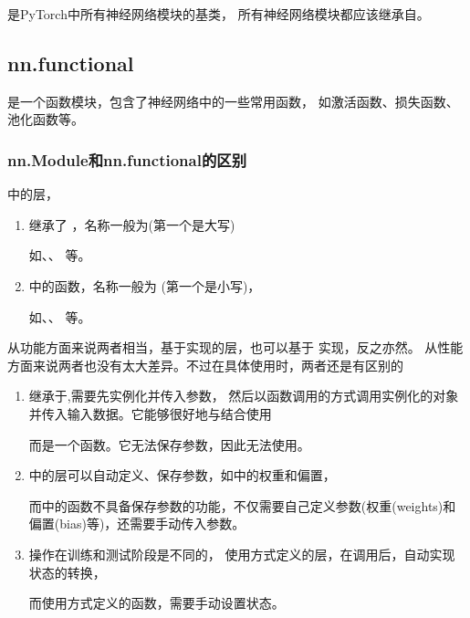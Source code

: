 是PyTorch中所有神经网络模块的基类，
所有神经网络模块都应该继承自。

\subsection{nn.functional}
\label{subsubsec:Pytorch_nn_functional}
是一个函数模块，包含了神经网络中的一些常用函数，
如激活函数、损失函数、池化函数等。


\subsubsection{nn.Module和nn.functional的区别}
\label{subsubsec:Pytorch_nn_Module_and_nn_functional_difference}
中的层，
\begin{enumerate}[label=\arabic*)]
    \item 继承了 ，名称一般为(第一个是大写)

    如、、 等。

    \item  {} 中的函数，名称一般为 (第一个是小写)，

    如、、
  等。
\end{enumerate}
 
  
从功能方面来说两者相当，基于实现的层，也可以基于 实现，反之亦然。
从性能方面来说两者也没有太大差异。不过在具体使用时，两者还是有区别的

\begin{enumerate}[label=\arabic*)]
    \item {}继承于,需要先实例化并传入参数，
    然后以函数调用的方式调用实例化的对象并传入输入数据。它能够很好地与结合使用

    而是一个函数。它无法保存参数，因此无法使用。
    \item {}中的层可以\textcolor{YBXPurple}{自动}定义、保存参数，如中的权重和偏置，

    而中的函数不具备保存参数的功能，不仅需要自己定义参数(权重(weights)和偏置(bias)等)，还需要手动传入参数。

    \item {}操作在训练和测试阶段是不同的，
    使用方式定义的层，在调用后，自动实现状态的转换，

    而使用方式定义的函数，需要手动设置状态。
\end{enumerate}

